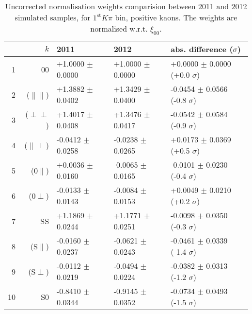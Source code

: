 \begin{table}[hbtp]
  \caption{\small Uncorrected normalisation weights comparision between 2011 and 2012 simulated samples, for $1^{\text{st}}K\pi$ bin, positive kaons. The weights are normalised w.r.t. $\xi_{00}$.}
  \center\footnotesize
  \begin{tabular}{r r l l l}      
   \multicolumn{2}{r}{$k$}    & 2011             & 2012              &   abs. difference ($\sigma$)        \\
    \hline
  1   &   00                   & +1.0000 $\pm$  0.0000  &  +1.0000 $\pm$  0.0000  &  +0.0000 $\pm$  0.0000 (+0.0 $\sigma$) \\
  2   &   ($\parallel\parallel$) & +1.3882 $\pm$  0.0402  &  +1.3429 $\pm$  0.0400  &  -0.0454 $\pm$  0.0566 (-0.8 $\sigma$) \\
  3   &   ($\perp\perp$)       & +1.4017 $\pm$  0.0408  &  +1.3476 $\pm$  0.0417  &  -0.0542 $\pm$  0.0584 (-0.9 $\sigma$) \\
  4   &   ($\parallel\perp$)   & -0.0412 $\pm$  0.0258  &  -0.0238 $\pm$  0.0265  &  +0.0173 $\pm$  0.0369 (+0.5 $\sigma$) \\
  5   &   ($0\parallel$)       & +0.0036 $\pm$  0.0160  &  -0.0065 $\pm$  0.0165  &  -0.0101 $\pm$  0.0230 (-0.4 $\sigma$) \\
  6   &   ($0\perp$)           & -0.0133 $\pm$  0.0143  &  -0.0084 $\pm$  0.0153  &  +0.0049 $\pm$  0.0210 (+0.2 $\sigma$) \\
  7   &   SS                   & +1.1869 $\pm$  0.0244  &  +1.1771 $\pm$  0.0251  &  -0.0098 $\pm$  0.0350 (-0.3 $\sigma$) \\
  8   &   (S$\parallel$)       & -0.0160 $\pm$  0.0237  &  -0.0621 $\pm$  0.0243  &  -0.0461 $\pm$  0.0339 (-1.4 $\sigma$) \\
  9   &   (S$\perp$)           & -0.0112 $\pm$  0.0219  &  -0.0494 $\pm$  0.0224  &  -0.0382 $\pm$  0.0313 (-1.2 $\sigma$) \\
  10  &   S0                   & -0.8410 $\pm$  0.0344  &  -0.9145 $\pm$  0.0352  &  -0.0734 $\pm$  0.0493 (-1.5 $\sigma$) \\
\hline
\end{tabular}
\end{table}

